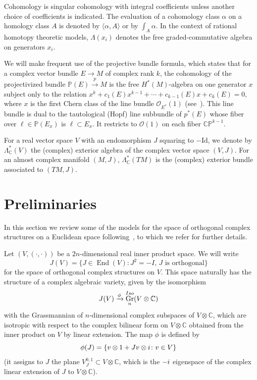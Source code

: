 \documentclass[11pt]{article}
\numberwithin{equation}{section}
\newcommand{\CP}{\mathbb{CP}}
\newcommand{\C}{\mathbb{C}}
\DeclareMathOperator{\Gr}{Gr}
\DeclareMathOperator{\End}{End}
\numberwithin{equation}{section}
\begin{document}
Cohomology is singular cohomology with integral coefficients unless another choice of coefficients is indicated. The evaluation of a cohomology class $\alpha$ on a homology class $A$ is denoted by $\langle \alpha, A \rangle$ or by $\int_A \alpha$. In the context of rational homotopy theoretic models, $\Lambda(x_i)$ denotes the free graded-commutative algebra on generators $x_i$.

We will make frequent use of the projective bundle formula, which states that for a complex vector bundle $E \to M$ of complex rank $k$, the cohomology of the projectivized bundle $\mathbb{P}(E) \xrightarrow{p} M$ is the free $H^*(M)$-algebra on one generator $x$ subject only to the relation $x^k + c_1(E)x^{k-1} + \cdots + c_{k-1}(E)x + c_k(E) = 0$, where $x$ is the first Chern class of the line bundle $\mathcal{O}_{E^*}(1)$ (see~\cite[Definition~15.13]{D12}). This line bundle is dual
to the tautological (Hopf) line subbundle of $p^*(E)$ whose fiber over $\ell \in \mathbb{P}(E_x)$ is $\ell \subset E_x$. It restricts to $\mathcal{O}(1)$ on each fiber $\CP^{k-1}$.

For a real vector space $V$ with an endomorphism $J$ squaring to $-\mathrm{Id}$, we denote by $\Lambda_\C^*(V)$ the (complex) exterior algebra of the complex vector space $(V,J)$. For an almost complex manifold $(M,J)$, $\Lambda_\C^\ast (TM)$ is the (complex) exterior bundle associated to $(TM,J)$.


\setcounter{section}{1}
\section{Preliminaries}\label{section2}
In this section we review some of the models for the space of orthogonal complex structures on a Euclidean space following~\cite[Section~IV.9]{LM}, to which we refer for further details.

Let $(V, (\cdot, \cdot ))$ be a $2n$-dimensional real inner product space. We will write \[J(V)=\big\{ J \in \End(V) \colon J^2=-I, \, J \text{ is orthogonal} \big\}\]
for the space of orthogonal complex structures on $V$. This space naturally has the structure of a complex algebraic variety, given by the isomorphism
\[ J(V) \xrightarrow{\phi} \Gr_n^{\rm Iso}(V\otimes \C) \]
with the Grassmannian of $n$-dimensional complex subspaces of $V\otimes \C$, which are isotropic with respect to the complex bilinear form on $V\otimes \C$ obtained from the inner product on $V$ by linear extension. The map $\phi$ is defined by
\[ \phi(J) = \{ v\otimes 1 + Jv \otimes {\rm i} \colon v \in V\} \]
(it assigns to $J$ the plane $V_J^{0,1} \subset V\otimes \C$, which is the $-{\rm i}$ eigenspace of the complex linear extension of $J$ to $V\otimes \C$).
\end{document}
